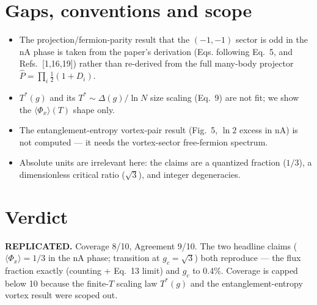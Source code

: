\documentclass[11pt]{article}
\begin{document}
\section{Gaps, conventions and scope}
\begin{itemize}
\item The projection/fermion-parity result that the $(-1,-1)$ sector is odd in
the nA phase is taken from the paper's derivation (Eqs. following Eq.~5, and
Refs.~[1,16,19]) rather than re-derived from the full many-body projector
$\hat P=\prod_i\frac12(1+D_i)$.
\item $T^*(g)$ and its $T^*\sim\Delta(g)/\ln N$ size scaling (Eq.~9) are not fit;
we show the $\langle\Phi_x\rangle(T)$ shape only.
\item The entanglement-entropy vortex-pair result (Fig.~5, $\ln2$ excess in nA)
is not computed --- it needs the vortex-sector free-fermion spectrum.
\item Absolute units are irrelevant here: the claims are a quantized fraction
($1/3$), a dimensionless critical ratio ($\sqrt3$), and integer degeneracies.
\end{itemize}

\section{Verdict}
\textbf{REPLICATED.} Coverage 8/10, Agreement 9/10. The two headline claims
($\langle\Phi_x\rangle=1/3$ in the nA phase; transition at $g_c=\sqrt3$) both
reproduce --- the flux fraction exactly (counting + Eq.~13 limit) and $g_c$ to
0.4\%. Coverage is capped below 10 because the finite-$T$ scaling law $T^*(g)$
and the entanglement-entropy vortex result were scoped out.
\end{document}
